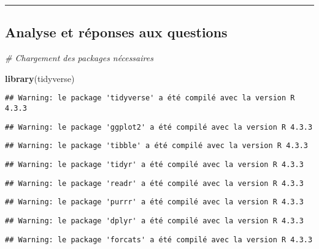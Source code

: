 \documentclass[
]{article}
\newenvironment{Shaded}{\begin{snugshade}}{\end{snugshade}}
\newcommand{\CommentTok}[1]{\textcolor[rgb]{0.56,0.35,0.01}{\textit{#1}}}
\newcommand{\FunctionTok}[1]{\textcolor[rgb]{0.13,0.29,0.53}{\textbf{#1}}}
\newcommand{\NormalTok}[1]{#1}
\begin{document}
\begin{center}\rule{0.5\linewidth}{0.5pt}\end{center}

\subsection{\texorpdfstring{\textbf{Analyse et réponses aux
questions}}{Analyse et réponses aux questions}}\label{analyse-et-ruxe9ponses-aux-questions}

\begin{Shaded}
\begin{Highlighting}[]
\CommentTok{\# Chargement des packages nécessaires}

\FunctionTok{library}\NormalTok{(tidyverse)}
\end{Highlighting}
\end{Shaded}

\begin{verbatim}
## Warning: le package 'tidyverse' a été compilé avec la version R 4.3.3
\end{verbatim}

\begin{verbatim}
## Warning: le package 'ggplot2' a été compilé avec la version R 4.3.3
\end{verbatim}

\begin{verbatim}
## Warning: le package 'tibble' a été compilé avec la version R 4.3.3
\end{verbatim}

\begin{verbatim}
## Warning: le package 'tidyr' a été compilé avec la version R 4.3.3
\end{verbatim}

\begin{verbatim}
## Warning: le package 'readr' a été compilé avec la version R 4.3.3
\end{verbatim}

\begin{verbatim}
## Warning: le package 'purrr' a été compilé avec la version R 4.3.3
\end{verbatim}

\begin{verbatim}
## Warning: le package 'dplyr' a été compilé avec la version R 4.3.3
\end{verbatim}

\begin{verbatim}
## Warning: le package 'forcats' a été compilé avec la version R 4.3.3
\end{verbatim}
\end{document}
